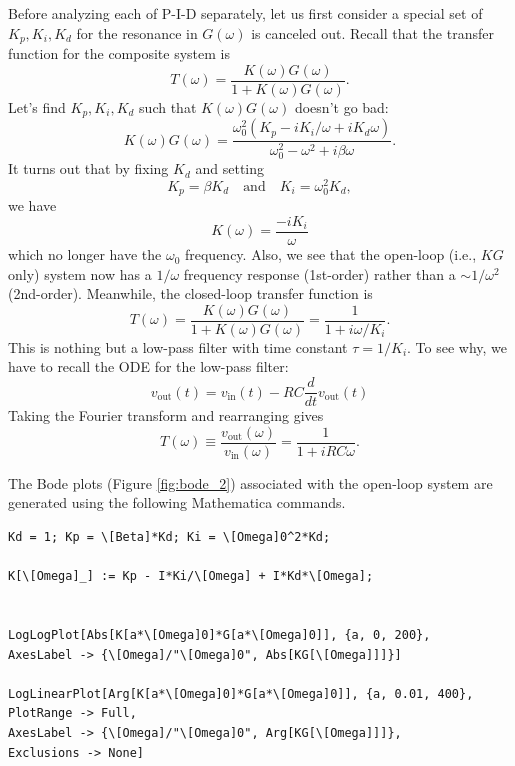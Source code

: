 \documentclass{article}
\theoremstyle{definition}
\newcommand{\f}[2]{\frac{#1}{#2}}
\begin{document}
Before analyzing each of P-I-D separately, let us first consider a special set of $K_p, K_i, K_d$ for the resonance in $G(\omega)$ is canceled out. Recall that the transfer function for the composite system is 
\begin{equation*}
T(\omega) = \f{K(\omega)G(\omega)}{1+K(\omega) G(\omega)}.
\end{equation*}
Let's find $K_p, K_i,K_d$ such that $K(\omega) G(\omega)$ doesn't go bad:
\begin{equation*}
K(\omega) G(\omega) = \f{\omega_0^2( K_p - iK_i/\omega + iK_d \omega)}{\omega_0^2 - \omega^2 + i\beta \omega}.
\end{equation*}
It turns out that by fixing $K_d$ and setting 
\begin{equation*}
K_p  =\beta K_d \quad \text{and} \quad K_i = \omega_0^2 K_d,
\end{equation*}
we have
\begin{equation*}
K(\omega) = \f{-iK_i}{\omega}
\end{equation*}
which no longer have the $\omega_0$ frequency. Also, we see that the open-loop (i.e., $KG$ only) system now has a $1/\omega$ frequency response (1st-order) rather than a $\sim 1/\omega^2$ (2nd-order). Meanwhile, the closed-loop transfer function is 
\begin{equation*}
T(\omega) = \f{K(\omega)G(\omega)}{1+ K(\omega) G(\omega)} = \f{1}{1+ i\omega/K_i}.
\end{equation*}
This is nothing but a low-pass filter with time constant $\tau = 1/K_i$. To see why, we have to recall the ODE for the low-pass filter: 
\begin{equation*}
v_\text{out}(t) = v_\text{in} (t) - RC \f{d}{dt}v_\text{out}(t)
\end{equation*}
Taking the Fourier transform and rearranging gives
\begin{equation*}
T(\omega) \equiv \f{v_\text{out}(\omega)}{v_\text{in}(\omega)} = \f{1}{1+iRC \omega}.
\end{equation*}

The Bode plots (Figure \ref{fig:bode_2}) associated with the open-loop system are generated using the following Mathematica commands. 
\begin{lstlisting}
Kd = 1; Kp = \[Beta]*Kd; Ki = \[Omega]0^2*Kd;

K[\[Omega]_] := Kp - I*Ki/\[Omega] + I*Kd*\[Omega]; 


LogLogPlot[Abs[K[a*\[Omega]0]*G[a*\[Omega]0]], {a, 0, 200}, 
AxesLabel -> {\[Omega]/"\[Omega]0", Abs[KG[\[Omega]]]}]

LogLinearPlot[Arg[K[a*\[Omega]0]*G[a*\[Omega]0]], {a, 0.01, 400}, 
PlotRange -> Full, 
AxesLabel -> {\[Omega]/"\[Omega]0", Arg[KG[\[Omega]]]}, 
Exclusions -> None]
\end{lstlisting}
\end{document}
